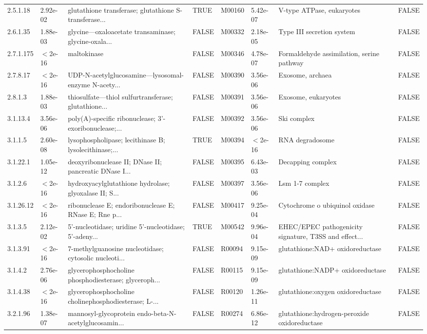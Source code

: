 \documentclass{article}\usepackage[]{graphicx}\usepackage[]{color}
\begin{document}
{{\begin{tabular}{llllllll}
  2.5.1.18 &  2.92e-02 & glutathione transferase; glutathione S-transferase... & TRUE & M00160 &  5.42e-07 & V-type ATPase, eukaryotes & FALSE \\ 
  2.6.1.35 &  1.88e-03 & glycine---oxaloacetate transaminase; glycine-oxala... & FALSE & M00332 &  2.18e-05 & Type III secretion system & FALSE \\ 
  2.7.1.175 & $<$2e-16 & maltokinase & FALSE & M00346 &  4.78e-07 & Formaldehyde assimilation, serine pathway & FALSE \\ 
  2.7.8.17 & $<$2e-16 & UDP-N-acetylglucosamine---lysosomal-enzyme N-acety... & FALSE & M00390 &  3.56e-06 & Exosome, archaea & FALSE \\ 
  2.8.1.3 &  1.88e-03 & thiosulfate---thiol sulfurtransferase; glutathione... & FALSE & M00391 &  3.56e-06 & Exosome, eukaryotes & FALSE \\ 
  3.1.13.4 &  3.56e-06 & poly(A)-specific ribonuclease; 3'-exoribonuclease;... & FALSE & M00392 &  3.56e-06 & Ski complex & FALSE \\ 
  3.1.1.5 &  2.60e-08 & lysophospholipase; lecithinase B; lysolecithinase;... & TRUE & M00394 & $<$2e-16 & RNA degradosome & FALSE \\ 
  3.1.22.1 &  1.05e-12 & deoxyribonuclease II; DNase II; pancreatic DNase I... & FALSE & M00395 &  6.43e-03 & Decapping complex & FALSE \\ 
  3.1.2.6 & $<$2e-16 & hydroxyacylglutathione hydrolase; glyoxalase II; S... & FALSE & M00397 &  3.56e-06 & Lsm 1-7 complex & FALSE \\ 
  3.1.26.12 & $<$2e-16 & ribonuclease E; endoribonuclease E; RNase E; Rne p... & FALSE & M00417 &  9.25e-04 & Cytochrome o ubiquinol oxidase & FALSE \\ 
  3.1.3.5 &  2.12e-02 & 5'-nucleotidase; uridine 5'-nucleotidase; 5'-adeny... & TRUE & M00542 &  9.96e-04 & EHEC/EPEC pathogenicity signature, T3SS and effect... & FALSE \\ 
  3.1.3.91 & $<$2e-16 & 7-methylguanosine nucleotidase; cytosolic nucleoti... & FALSE & R00094 &  9.15e-09 & glutathione:NAD+ oxidoreductase & FALSE \\ 
  3.1.4.2 &  2.76e-06 & glycerophosphocholine phosphodiesterase; glyceroph... & FALSE & R00115 &  9.15e-09 & glutathione:NADP+ oxidoreductase & FALSE \\ 
  3.1.4.38 & $<$2e-16 & glycerophosphocholine cholinephosphodiesterase; L-... & FALSE & R00120 &  1.26e-11 & glutathione:oxygen oxidoreductase & FALSE \\ 
  3.2.1.96 &  1.38e-07 & mannosyl-glycoprotein endo-beta-N-acetylglucosamin... & FALSE & R00274 &  6.86e-12 & glutathione:hydrogen-peroxide oxidoreductase & FALSE \\ 

\end{tabular}}}
\end{document}
